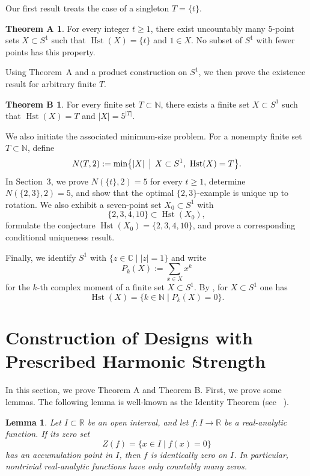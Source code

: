 \documentclass{amsart}
\newtheorem{lem}[thm]{Lemma}
\theoremstyle{definition}
\newtheorem*{thmA}{Theorem A}
\newtheorem*{thmB}{Theorem B}
\DeclareMathOperator{\Hst}{Hst}
\newcommand{\RR}{\mathbb{R}}
\newcommand{\CC}{\mathbb{C}}
\newcommand{\NN}{\mathbb{N}}
\begin{document}
Our first result treats the case of a singleton \(T=\{t\}\).

\begin{thmA}\label{thm:A}
For every integer \(t\ge1\), there exist uncountably many \(5\)-point sets
\(X\subset S^1\) such that \(\Hst(X)=\{t\}\) and \(1\in X\).  No subset of
\(S^1\) with fewer points has this property.
\end{thmA}

Using Theorem~A and a product construction on \(S^1\), we then prove the
existence result for arbitrary finite \(T\).

\begin{thmB}\label{thm:B}
For every finite set \(T\subset\NN\), there exists a finite set \(X\subset S^1\)
such that \(\Hst(X)=T\) and \(|X|=5^{|T|}\).
\end{thmB}

We also initiate the associated minimum-size problem.  For a nonempty finite set
\(T\subset\NN\), define
\[
  N(T,2):=
  \min\bigl\{|X| \,\bigm|\, X\subset S^1,\ \Hst(X)=T\bigr\}.
\]
In Section~3, we prove \(N(\{t\},2)=5\) for every \(t\ge1\), determine
\(N(\{2,3\},2)=5\), and show that the optimal \(\{2,3\}\)-example is unique up
to rotation.  We also exhibit a seven-point set \(X_0\subset S^1\) with
\[
  \{2,3,4,10\}\subset\Hst(X_0),
\]
formulate the conjecture \(\Hst(X_0)=\{2,3,4,10\}\), and prove a corresponding
conditional uniqueness result.

Finally, we identify \(S^1\) with \(\{z\in\CC\mid |z|=1\}\) and write
\[
  P_k(X):=\sum_{x\in X}x^k
\]
for the \(k\)-th complex moment of a finite set \(X\subset S^1\).  By
\cite[Lemma~1]{Hong82}, for \(X\subset S^1\) one has
\[
  \Hst(X)=\{k\in\NN\mid P_k(X)=0\}.
\]
\section{Construction of Designs with Prescribed Harmonic Strength}
\label{sec:hst_T}

In this section, we prove Theorem A and Theorem B.
First, we prove some lemmas. The following lemma is well-known as the Identity Theorem (see ~\cite[Corollary 1.2.7]{KP02}).

\begin{lem}\label{lem:zeroP}
  Let $I\subset\RR$ be an open interval, and let $f:I\to\RR$ be a real-analytic function. If its zero set
  \[Z(f)=\{x\in I\mid f(x)=0\}\]
  has an accumulation point in $I$, then $f$ is identically zero on $I$. In particular, nontrivial real-analytic functions have only countably many zeros.
\end{lem}
\end{document}
